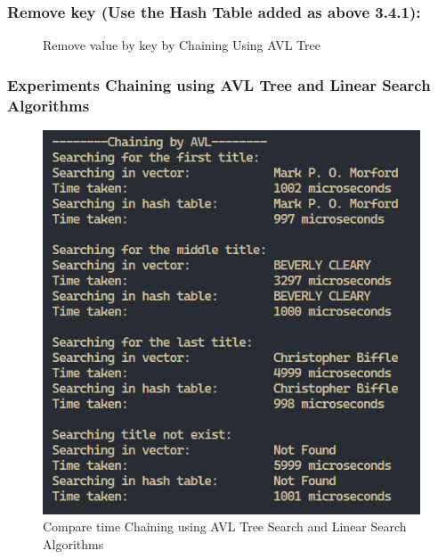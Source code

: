 \subsubsection{Remove key (Use the Hash Table added as above 3.4.1):}
\begin{figure}[H]
	\centering
	\qquad
	\caption{Remove value by key by Chaining Using AVL Tree}%
\end{figure}

\subsubsection{Experiments Chaining using AVL Tree and Linear Search Algorithms}
\begin{figure}[H]
	\centering
	\includegraphics[width=0.7\linewidth]{img/ChainingAVL/compare.PNG}
	\caption{Compare time Chaining using AVL Tree Search and Linear Search Algorithms}
\end{figure}

